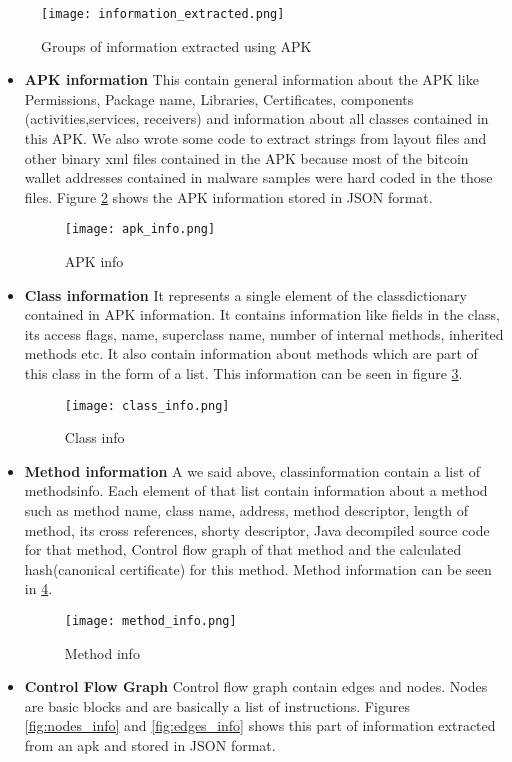 \documentclass[../main.tex]{subfile}
\begin{document}
		\begin{figure}
			\texttt{[image: information\_extracted.png]}
			\caption{Groups of information extracted using APK}
			\label{fig:info_extracted}
		\end{figure}
		
		
		\begin{itemize}
			\item \textbf{APK information} This contain general information about the APK like Permissions, Package name, Libraries, Certificates, components (activities,services, receivers) and information about all classes contained in this APK. We also wrote some code to extract strings from layout files and other binary xml files contained in the APK because most of the bitcoin wallet addresses contained in malware samples were hard coded in the those files. Figure \ref{fig:apk_info} shows the APK information stored in JSON format.
			\begin{figure}
						\texttt{[image: apk\_info.png]}
						\caption{APK info}
						\label{fig:apk_info}	
			\end{figure}
			
			\item \textbf{Class information} It represents a single element of the class\textunderscore dictionary contained in APK information. It contains information like fields in the class, its access flags, name, superclass name, number of internal methods, inherited methods etc. It also contain information about methods which are part of this class in the form of a list. This information can be seen in figure \ref{fig:class_info}.
			\begin{figure}
				\texttt{[image: class\_info.png]}
				\caption{Class info}
				\label{fig:class_info}	
			\end{figure}
			
			
			\item \textbf{Method information} A we said above, class\textunderscore information contain a list of methods\textunderscore info. Each element of that list contain information about a method such as method name, class name, address, method descriptor, length of method, its cross references, shorty descriptor, Java decompiled source code for that method, Control flow graph of that method and the calculated hash(canonical certificate) for this method. Method information can be seen in \ref{fig:method_info}.
			\begin{figure}
				\texttt{[image: method\_info.png]}
				\caption{Method info}
				\label{fig:method_info}	
			\end{figure}
			\item \textbf{Control Flow Graph} Control flow graph contain edges and nodes. Nodes are basic blocks and are basically a list of instructions. Figures \ref{fig:nodes_info} and \ref{fig:edges_info} shows this part of information extracted from an apk and stored in JSON format.


\end{itemize}
\end{document}
